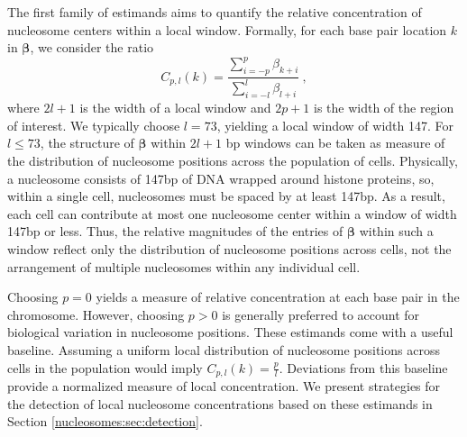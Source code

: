 The first family of estimands aims to quantify the relative concentration of nucleosome centers within a local window.
Formally, for each base pair location $k$ in $\bm \beta$, we consider the ratio
\begin{equation}
C_{p,l}(k) = \frac{\sum_{i=-p}^{p} \beta_{k + i}}{\sum_{i=-l}^{l} \beta_{l + i}} \label{nucleosomes:eq:concentration} \ ,
\end{equation}
where $2l + 1$ is the width of a local window and $2p + 1$ is the width of the region of interest.
We typically choose $l = 73$, yielding a local window of width 147.
%
For $l \leq 73$, the structure of $\bm \beta$ within $2l+1$ bp windows can be taken as measure of the distribution of nucleosome positions across the population of cells.
Physically, a nucleosome consists of 147bp of DNA wrapped around histone proteins, so, within a single cell, nucleosomes must be spaced by at least 147bp.
As a result, each cell can contribute at most one nucleosome center within a window of width 147bp or less.
Thus, the relative magnitudes of the entries of $\bm \beta$ within such a window reflect only the distribution of nucleosome positions across cells, not the arrangement of multiple nucleosomes within any individual cell.

Choosing $p = 0$ yields a measure of relative concentration at each base pair in the chromosome.
However, choosing $p > 0$ is generally preferred to account for biological variation in nucleosome positions.
These estimands come with a useful baseline.
Assuming a uniform local distribution of nucleosome positions across cells in the population would imply $C_{p,l}(k) = \frac{p}{l}$.
Deviations from this baseline provide a normalized measure of local concentration.
We present strategies for the detection of local nucleosome concentrations based on these estimands in Section \ref{nucleosomes:sec:detection}.

